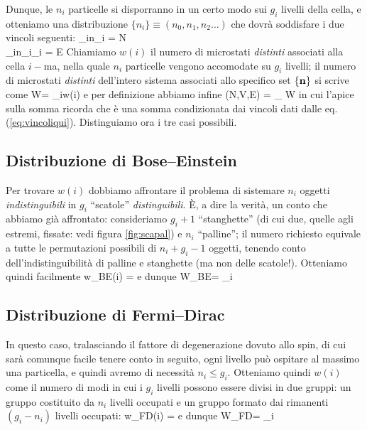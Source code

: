 Dunque, le $n_{i}$ particelle si disporranno in un certo modo sui $g_{i}$ livelli della cella, e otteniamo una distribuzione $\{n_{i}\}\equiv (n_{0}, n_{1}, n_{2}\dots)$ che dovrà soddisfare i due vincoli seguenti:
\bea
\sum_{i}n_{i} = N \nonumber \\
\sum_{i}n_{i}\eps_{i} = E
\label{eq:vincoliqui}
\eea
Chiamiamo $w(i)$ il numero di microstati {\em distinti} associati alla cella $i-$ma, nella quale $n_{i}$ particelle vengono accomodate su $g_{i}$ livelli; il numero di microstati {\em distinti} dell'intero sistema associati allo specifico set $\{\mathbf{n}\}$ si scrive come
\be
W\nset = \prod_{i}w(i)
\ee
e per definizione abbiamo infine
\be
\Omega(N,V,E) = \sum_{\nset} W\nset
\ee
in cui l'apice sulla somma ricorda che è una somma condizionata dai vincoli dati dalle eq. (\ref{eq:vincoliqui}). Distinguiamo ora i tre casi possibili.

\subsection{Distribuzione di Bose--Einstein}
Per trovare $w(i)$ dobbiamo affrontare il problema di sistemare $n_{i}$ oggetti {\em indistinguibili} in $g_{i}$ ``scatole'' {\em distinguibili}. È, a dire la verità, un conto che abbiamo già affrontato: consideriamo $g_{i}+1$ ``stanghette'' (di cui due, quelle agli estremi, fissate: vedi figura \ref{fig:scapal}) e $n_{i}$ ``palline''; il numero richiesto equivale a tutte le permutazioni possibili di $n_{i} + g_{i} - 1$ oggetti, tenendo conto dell'indistinguibilità di palline e stanghette (ma non delle scatole!). Otteniamo quindi facilmente
\be
w_{\textrm{\scriptsize BE}}(i) = 
\ee
e dunque
\be
W_{\textrm{\scriptsize BE}}\nset = \prod_{i}
\ee

\subsection{Distribuzione di Fermi--Dirac}
In questo caso, tralasciando il fattore di degenerazione dovuto allo spin, di cui sarà comunque facile tenere conto in seguito, ogni livello può ospitare al massimo una particella, e quindi avremo di necessità $n_{i} \le g_{i}$. Otteniamo quindi $w(i)$ come il numero di modi in cui i $g_{i}$ livelli possono essere divisi in due gruppi: un gruppo costituito da $n_{i}$ livelli occupati e un gruppo formato dai rimanenti $(g_{i}-n_{i})$ livelli occupati:
\be
w_{\textrm{\scriptsize FD}}(i) = 
\ee
e dunque
\be
W_{\textrm{\scriptsize FD}}\nset = \prod_{i}
\ee

